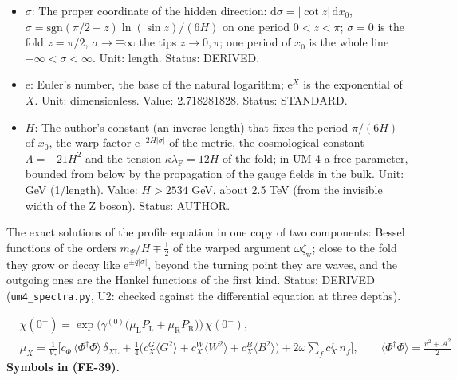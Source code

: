 \documentclass[
  10pt,
]{article}
\begin{document}
\begin{itemize}
\item
  \(\sigma\): The proper coordinate of the hidden direction:
  \(\mathrm{d}\sigma = \lvert\cot z\rvert\,\mathrm{d}x_0\),
  \(\sigma = \mathrm{sgn}(\pi/2 - z)\ln(\sin z)/(6H)\) on one period
  \(0 < z < \pi\); \(\sigma = 0\) is the fold \(z = \pi/2\),
  \(\sigma \to \mp\infty\) the tips \(z \to 0, \pi\); one period of
  \(x_0\) is the whole line \(-\infty < \sigma < \infty\). Unit: length.
  Status: DERIVED.
\item
  \(\mathrm{e}\): Euler's number, the base of the natural logarithm;
  \(\mathrm{e}^{X}\) is the exponential of \(X\). Unit: dimensionless.
  Value: 2.718281828. Status: STANDARD.
\item
  \(H\): The author's constant (an inverse length) that fixes the period
  \(\pi/(6H)\) of \(x_0\), the warp factor
  \(\mathrm{e}^{-2H\lvert\sigma\rvert}\) of the metric, the cosmological
  constant \(\Lambda = -21H^2\) and the tension
  \(\kappa\lambda_{\mathrm{F}} = 12H\) of the fold; in UM-4 a free
  parameter, bounded from below by the propagation of the gauge fields
  in the bulk. Unit: GeV (1/length). Value: \(H > 2534\) GeV, about 2.5
  TeV (from the invisible width of the Z boson). Status: AUTHOR.
\end{itemize}

The exact solutions of the profile equation in one copy of two
components: Bessel functions of the orders \(m_\Psi/H \mp \frac12\) of
the warped argument \(\omega\zeta_{\mathrm{w}}\); close to the fold they
grow or decay like \(\mathrm{e}^{\pm q\lvert\sigma\rvert}\), beyond the
turning point they are waves, and the outgoing ones are the Hankel
functions of the first kind. Status: DERIVED (\texttt{um4\_spectra.py},
U2: checked against the differential equation at three depths).

\[
\begin{aligned}
&\chi(0^+) = \exp\Big(\gamma^{(0)}\big(\mu_{\mathrm{L}}P_{\mathrm{L}} + \mu_{\mathrm{R}}P_{\mathrm{R}}\big)\Big)\,\chi(0^-),\\
&\mu_X = \frac{1}{V_*}\Big[c_\Phi\,\langle\Phi^\dagger\Phi\rangle\,\delta_{X\mathrm{L}} + \frac14\big(c^{G}_X\langle G^2\rangle
 + c^{W}_X\langle W^2\rangle + c^{B}_X\langle B^2\rangle\big) + 2\omega\sum_f c^{f}_X\,n_f\Big],\qquad
 \langle\Phi^\dagger\Phi\rangle = \frac{v^2 + \mathcal{A}^2}{2}
\end{aligned} \tag{FE-39}
\] \textbf{Symbols in (FE-39).}
\end{document}
